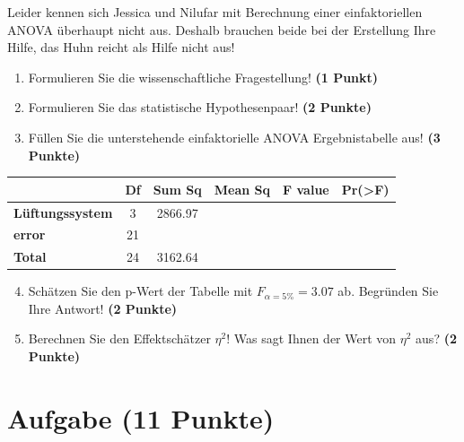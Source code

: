 \documentclass[a4paper, 9pt]{scrartcl}\usepackage[]{graphicx}\usepackage[]{xcolor}
\begin{document}
\vspace{1ex}

Leider kennen sich Jessica und Nilufar mit Berechnung einer einfaktoriellen ANOVA überhaupt nicht aus. Deshalb brauchen beide bei der Erstellung Ihre Hilfe, das Huhn reicht als Hilfe nicht aus! 

\begin{enumerate}
  \item Formulieren Sie die wissenschaftliche Fragestellung! \textbf{(1 Punkt)}
  \item Formulieren Sie das statistische Hypothesenpaar! \textbf{(2 Punkte)}
\item Füllen Sie die unterstehende einfaktorielle ANOVA Ergebnistabelle aus! \textbf{(3 Punkte)}
\end{enumerate}

\vspace{1Ex}

\begin{center}
  \Large
  \begin{tabular}{lccccp{3cm}}
\toprule
     & \textbf{Df} & \textbf{Sum Sq} & \textbf{Mean Sq} & \textbf{F value} & \textbf{Pr(>F)} \strut\\
    \midrule
   \textbf{Lüftungssystem}  & 3 & 2866.97 &  &  &  \strut\\
   \textbf{error}  & 21 &  &  &  &  \strut\\
   \textbf{Total}  & 24 & 3162.64 &  &  &  \strut\\
\bottomrule
  \end{tabular}
\end{center}

\vspace{1Ex}

\begin{enumerate}
  \setcounter{enumi}{3}
\item Schätzen Sie den p-Wert der Tabelle mit $F_{\alpha = 5\%} = 3.07$ ab. Begründen Sie Ihre Antwort! \textbf{(2 Punkte)}
\item Berechnen Sie den Effektschätzer $\eta^2$! Was sagt Ihnen der Wert von $\eta^2$ aus? \textbf{(2 Punkte)}
\end{enumerate}



 
\clearpage

\section{Aufgabe \hfill (11 Punkte)}
\end{document}
